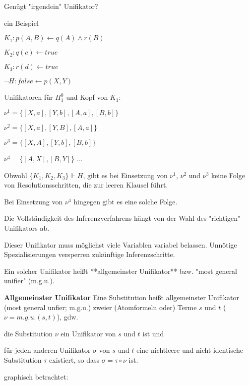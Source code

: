 \documentclass[a4paper]{article}
\renewcommand{\note}[2]{\begin{noteBox} \textbf{#1} #2 \end{noteBox}}
\begin{document}
\begin{multicols}{3}
  Genügt "irgendein" Unifikator?
  \begin{itemize*}
    \item ein Beispiel
    \begin{itemize*}
      \item $K_1: p(A,B)\leftarrow q(A)\wedge r(B)$
      \item $K_2:q(c)\leftarrow true$
      \item $K_3:r(d)\leftarrow true$
      \item $\lnot H: false\leftarrow p(X,Y)$
    \end{itemize*}
    \item Unifikatoren für $H_1^0$ und Kopf von $K_1$:
    \begin{itemize*}
      \item $\nu^1 = \{[X,a],[Y,b],[A,a],[B,b]\}$
      \item $\nu^2 =\{[X,a],[Y,B],[A,a]\}$
      \item $\nu^3 =\{[X,A],[Y,b],[B,b]\}$
      \item $\nu^4=\{[A,X],[B,Y]\}$ ...
    \end{itemize*}
    \item Obwohl $\{K_1, K_2, K_3\}\Vdash H$, gibt es bei Einsetzung von $\nu^1$, $\nu^2$ und $\nu^3$ keine Folge von Resolutionsschritten, die zur leeren Klausel führt.
    \item Bei Einsetzung von $\nu^4$ hingegen gibt es eine solche Folge.
    \item Die Vollständigkeit des Inferenzverfahrens hängt von der Wahl des "richtigen" Unifikators ab.
    \item Dieser Unifikator muss möglichst viele Variablen variabel belassen. Unnötige Spezialisierungen versperren zukünftige Inferenzschritte.
    \item Ein solcher Unifikator heißt **allgemeinster Unifikator** bzw. "most general unifier" (m.g.u.).
  \end{itemize*}

  \note{Allgemeinster Unifikator}{Eine Substitution heißt allgemeinster Unifikator (most general unfier; m.g.u.) zweier (Atomformeln oder) Terme $s$ und $t$ ($\nu= m.g.u.(s,t)$), gdw.
    \begin{enumerate*}
      \item die Substitution $\nu$ ein Unifikator von $s$ und $t$ ist und
      \item für jeden anderen Unifikator $\sigma$ von $s$ und $t$ eine nichtleere und nicht identische Substitution $\tau$ existiert, so dass $\sigma=\tau\circ\nu$ ist.
    \end{enumerate*}
    graphisch betrachtet: %
  }


\end{multicols}
\end{document}
